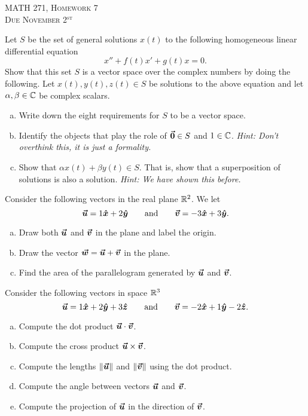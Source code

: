 \documentclass[12pt]{article} %
\begin{document}
\begin{center}
   \textsc{\large MATH 271, Homework 7}\\
   \textsc{Due November 2$^\textrm{st}$}
\end{center}
\vspace{.5cm}

\begin{problem}
Let $S$ be the set of general solutions $x(t)$ to the following homogeneous linear differential equation 
\[
x''+f(t)x'+g(t)x=0.
\]
Show that this set $S$ is a vector space over the complex numbers by doing the following. Let $x(t),y(t),z(t) \in S$ be solutions to the above equation and let $\alpha, \beta \in \mathbb{C}$ be complex scalars.
\begin{enumerate}[(a)]
    \item Write down the eight requirements for $S$ to be a vector space.  
    \item Identify the objects that play the role of $\boldsymbol{\vec{0}} \in S$ and $1\in \mathbb{C}$. \emph{Hint: Don't overthink this, it is just a formality.} 
    \item Show that $\alpha x(t) + \beta y(t) \in S$. That is, show that a superposition of solutions is also a solution. \emph{Hint: We have shown this before.}
\end{enumerate}
\end{problem}

\begin{problem}
Consider the following vectors in the real plane $\mathbb{R}^2$. We let
\[
\boldsymbol{\vec{u}} = 1\boldsymbol{\hat{x}} + 2\boldsymbol{\hat{y}} \qquad \textrm{and} \qquad \boldsymbol{\vec{v}} = -3\boldsymbol{\hat{x}}+ 3\boldsymbol{\hat{y}}.
\]
\begin{enumerate}[(a)]
    \item Draw both $\boldsymbol{\vec{u}}$ and $\boldsymbol{\vec{v}}$ in the plane and label the origin.
    \item Draw the vector $\boldsymbol{\vec{w}} = \boldsymbol{\vec{u}}+\boldsymbol{\vec{v}}$ in the plane.
    \item Find the area of the parallelogram generated by $\boldsymbol{\vec{u}}$ and $\boldsymbol{\vec{v}}$.
\end{enumerate}
\end{problem}

\begin{problem}
Consider the following vectors in space $\mathbb{R}^3$
\[
\boldsymbol{\vec{u}} = 1\boldsymbol{\hat{x}} + 2\boldsymbol{\hat{y}} + 3\boldsymbol{\hat{z}} \qquad \textrm{and} \qquad \boldsymbol{\vec{v}} = -2\boldsymbol{\hat{x}} +1\boldsymbol{\hat{y}} -2\boldsymbol{\hat{z}}.
\]
\begin{enumerate}[(a)]
    \item Compute the dot product $\boldsymbol{\vec{u}}\cdot \boldsymbol{\vec{v}}$. 
    \item Compute the cross product $\boldsymbol{\vec{u}} \times \boldsymbol{\vec{v}}$.
    \item Compute the lengths $\|\boldsymbol{\vec{u}}\|$ and $\|\boldsymbol{\vec{v}}\|$ using the dot product.
    \item Compute the angle between vectors $\boldsymbol{\vec{u}}$ and $\boldsymbol{\vec{v}}$. 
    \item Compute the projection of $\boldsymbol{\vec{u}}$ in the direction of $\boldsymbol{\vec{v}}$. 
\end{enumerate}
\end{problem}
\end{document}
